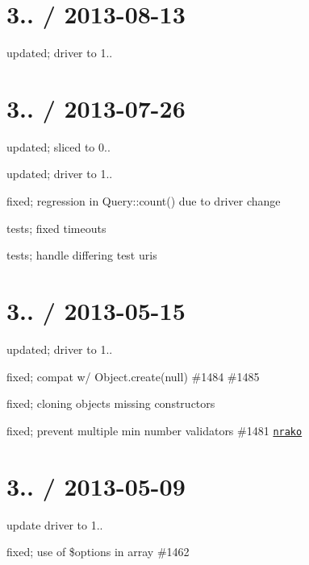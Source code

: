 \section*{3.. / 2013-\/08-\/13 }


\begin{DoxyItemize}
\item updated; driver to 1..
\end{DoxyItemize}

\section*{3.. / 2013-\/07-\/26 }


\begin{DoxyItemize}
\item updated; sliced to 0..
\item updated; driver to 1..
\item fixed; regression in Query\+::count() due to driver change
\item tests; fixed timeouts
\item tests; handle differing test uris
\end{DoxyItemize}

\section*{3.. / 2013-\/05-\/15 }


\begin{DoxyItemize}
\item updated; driver to 1..
\item fixed; compat w/ Object.\+create(null) \#1484 \#1485
\item fixed; cloning objects missing constructors
\item fixed; prevent multiple min number validators \#1481 \href{https://github.com/nrako}{\tt nrako}
\end{DoxyItemize}

\section*{3.. / 2013-\/05-\/09 }


\begin{DoxyItemize}
\item update driver to 1..
\item fixed; use of \$options in array \#1462
\end{DoxyItemize}

